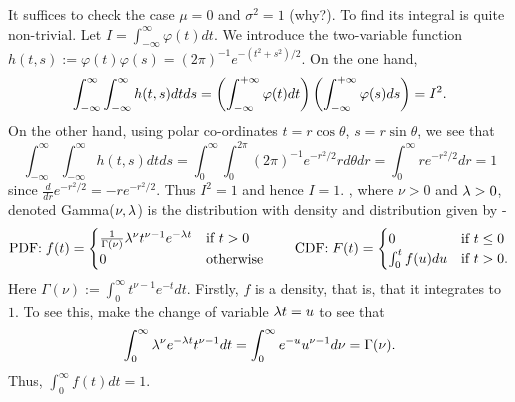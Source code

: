 \documentclass[preprint,  11pt]{amsart}
\def\sig{{\sigma}}
\renewcommand\phi{{\varphi}}
\begin{document}
\bprf It suffices to check the case $\mu=0$ and $\sig^{2}=1$ (why?).   To find its integral is quite non-trivial. Let $I=\int_{-\infty}^{\infty} \phi(t)dt$. We introduce the two-variable function $h(t,s):=\phi(t)\phi(s)=(2\pi)^{-1}e^{-(t^{2}+s^{2})/2}$. On the one hand,
$$
\int_{-\infty}^{\infty}\int_{-\infty}^{\infty}h(t,s)dtds = \l(\int_{-\infty}^{+\infty}\phi(t)dt\r) \l(\int_{-\infty}^{+\infty}\phi(s)ds\r)=I^{2}.
$$
On the other hand, using polar co-ordinates $t=r\cos\theta$, $s=r\sin \theta$, we see that
$$
\int_{-\infty}^{\infty}\int_{-\infty}^{\infty}h(t,s)dtds =\int_{0}^{\infty}\int_{0}^{2\pi}(2\pi)^{-1}e^{-r^{2}/2}rd\theta dr = \int_{0}^{\infty}re^{-r^{2}/2}dr =1
$$
since $\frac{d}{dr}e^{-r^{2}/2}=-re^{-r^{2}/2}$. Thus $I^{2}=1$ and hence $I=1$.
\eprf
\eeg
\beg {}, where $\nu>0$ and $\lambda>0$, denoted Gamma($\nu,\lambda$) is the distribution with density and distribution given by -
$$
\mbox{PDF:}\; f(t) = \begin{cases}\frac{1}{\Gamma(\nu)}\lambda^{\nu} t^{\nu-1}e^{-\lambda t}& \mbox{if } t>0 \\ 0 & \mbox{otherwise} \end{cases}\qquad
\mbox{CDF:}\; F(t) = \begin{cases}0 & \mbox{if } t\le 0 \\ \int_{0}^{t}f(u)du & \mbox{if }t>0.\end{cases}
$$
Here $\Gamma(\nu):=\int_{0}^{\infty}t^{\nu-1}e^{-t}dt$. Firstly, $f$ is a density, that is, that it integrates to $1$. To see this, make the change of variable $\lambda t=u$ to see that
$$
\int_{0}^{\infty}\lambda^{\nu}e^{-\lambda t}t^{\nu-1}dt = \int_{0}^{\infty}e^{-u}u^{\nu-1}d\nu = \Gamma(\nu).
$$
Thus, $\int_{0}^{\infty} f(t)dt=1$.
\end{document}
